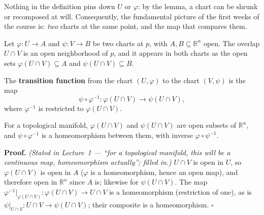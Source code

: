 \documentclass[11pt]{report}
\makeatletter
\newcounter{defcounter}[section]
\newcounter{thmcounter}[section]
\renewenvironment{proof}[1][Proof]{\noindent\textbf{#1.} }{\hfill$\square$\par\vspace{5pt}}
\newcommand{\thmlabel}[1]{\edef\@currentlabel{\arabic{section}.\arabic{thmcounter}}\label{#1}}
\newcommand{\deflabel}[1]{\edef\@currentlabel{\arabic{section}.\arabic{defcounter}}\label{#1}}
\newcommand{\leeref}[1]{\par\smallskip{\raggedleft\footnotesize\textsc{Lee}:\ #1\par}}
\makeatother
\begin{document}
\begin{rembox}\label{rem:charts-not-unique}
Nothing in the definition pins down $U$ or $\varphi$: by the lemma, a chart can be shrunk or recomposed at will. Consequently, the fundamental picture of the first weeks of the course is: \emph{two} charts at the same point, and the map that compares them.
\end{rembox}

Let $\varphi : U \to A$ and $\psi : V \to B$ be two charts at $p$, with $A, B \subseteq \mathbb{R}^n$ open. The overlap $U \cap V$ is an open neighborhood of $p$, and it appears in both charts as the open sets $\varphi(U \cap V) \subseteq A$ and $\psi(U \cap V) \subseteq B$.

\begin{center}
\end{center}

\begin{defbox}\deflabel{def:transition-function-preliminary}
The \textbf{transition function} from the chart $(U, \varphi)$ to the chart $(V, \psi)$ is the map
\[
\psi \circ \varphi^{-1} : \varphi(U \cap V) \longrightarrow \psi(U \cap V),
\]
where $\varphi^{-1}$ is restricted to $\varphi(U \cap V)$.
\end{defbox}

\begin{propbox}\thmlabel{prop:transition-homeo}
For a topological manifold, $\varphi(U \cap V)$ and $\psi(U \cap V)$ are open subsets of $\mathbb{R}^n$, and $\psi \circ \varphi^{-1}$ is a homeomorphism between them, with inverse $\varphi \circ \psi^{-1}$.
\leeref{Ch.~1, \emph{Smooth Structures}}
\end{propbox}

\begin{proof}
\textit{(Stated in Lecture~1 --- ``for a topological manifold, this will be a continuous map, homeomorphism actually''; filled in.)} $U \cap V$ is open in $U$, so $\varphi(U \cap V)$ is open in $A$ ($\varphi$ is a homeomorphism, hence an open map), and therefore open in $\mathbb{R}^n$ since $A$ is; likewise for $\psi(U \cap V)$. The map $\varphi^{-1}|_{\varphi(U \cap V)} : \varphi(U \cap V) \to U \cap V$ is a homeomorphism (restriction of one), as is $\psi|_{U \cap V} : U \cap V \to \psi(U \cap V)$; their composite is a homeomorphism.
\end{proof}
\end{document}
